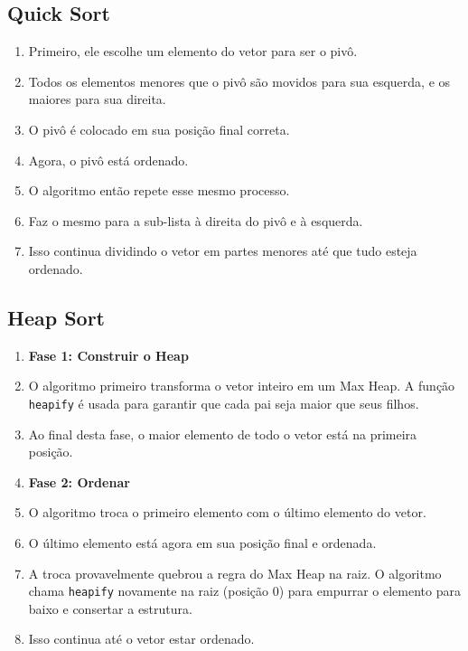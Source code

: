 \documentclass[a4paper]{article}
\begin{document}
    \subsection{Quick Sort}\label{subsec:quick-sort}
    \begin{enumerate}
        \item Primeiro, ele escolhe um elemento do vetor para ser o pivô.
        \item Todos os elementos menores que o pivô são movidos para sua esquerda, e os maiores para sua direita.
        \item O pivô é colocado em sua posição final correta.
        \item Agora, o pivô está ordenado.
        \item O algoritmo então repete esse mesmo processo.
        \item Faz o mesmo para a sub-lista à direita do pivô e à esquerda.
        \item Isso continua dividindo o vetor em partes menores até que tudo esteja ordenado.
    \end{enumerate}

    \subsection{Heap Sort}\label{subsec:heap-sort}
    \begin{enumerate}
        \item \textbf{Fase 1: Construir o Heap}
        \item O algoritmo primeiro transforma o vetor inteiro em um Max Heap.
        A função \texttt{heapify} é usada para garantir que cada pai seja maior que seus filhos.
        \item Ao final desta fase, o maior elemento de todo o vetor está na primeira posição.
        \item \textbf{Fase 2: Ordenar}
        \item O algoritmo troca o primeiro elemento com o último elemento do vetor.
        \item O último elemento está agora em sua posição final e ordenada.
        \item A troca provavelmente quebrou a regra do Max Heap na raiz.
        O algoritmo chama \texttt{heapify} novamente na raiz (posição 0) para empurrar o elemento para baixo e consertar a estrutura.
        \item Isso continua até o vetor estar ordenado.
    \end{enumerate}
\end{document}
